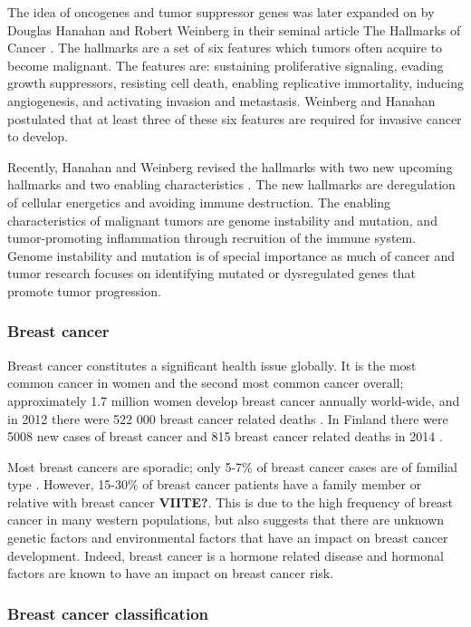 The idea of oncogenes and tumor suppressor genes was later expanded on by
Douglas Hanahan and Robert Weinberg in their seminal article The Hallmarks of
Cancer \citep{Hanahan2000}. The hallmarks are a set of six features which
tumors often acquire to become malignant. The features are: sustaining
proliferative signaling, evading growth suppressors, resisting cell death,
enabling replicative immortality, inducing angiogenesis, and activating
invasion and metastasis. Weinberg and Hanahan postulated that at least three
of these six features are required for invasive cancer to develop.

Recently, Hanahan and Weinberg revised the hallmarks with two new upcoming
hallmarks and two enabling characteristics \citep{Hanahan2011}. The new
hallmarks are deregulation of cellular energetics and avoiding immune
destruction. The enabling characteristics of malignant tumors are genome
instability and mutation, and tumor-promoting inflammation through recruition
of the immune system. Genome instability and mutation is of special importance
as much of cancer and tumor research focuses on identifying mutated or
dysregulated genes that promote tumor progression.



\subsubsection{Breast cancer}\label{breast-cancer}

Breast cancer constitutes a significant health issue globally. It is the most
common cancer in women and the second most common cancer overall;
approximately 1.7 million women develop breast cancer annually world-wide, and
in 2012 there were 522 000 breast cancer related deaths
\citep{Ferlay2015}. In Finland there were 5008 new cases of breast cancer
 and 815 breast cancer related deaths in 2014 \citep{Syoparekisteri}.

Most breast cancers are sporadic; only 5-7\% of breast cancer cases are of
familial type \citep{Melchor2013}. However, 15-30\% of breast cancer patients
have a family member or relative with breast cancer \textbf{VIITE?}. This is due to the high
frequency of breast cancer in many western populations, but also suggests that
there are unknown genetic factors and environmental factors that have an
impact on breast cancer development.  Indeed, breast cancer is a hormone
related disease and hormonal factors are known to have an impact on
breast cancer risk.


\subsubsection{Breast cancer classification}\label{breast-cancer-classification}

